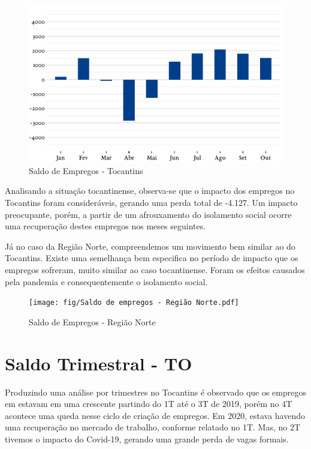 \begin{figure}[h]
	\caption{Saldo de Empregos - Tocantins}
	\includegraphics{fig/Saldo de empregos - Tocantins.pdf}
\end{figure}

\par Analisando a situação tocantinense, observa-se que o impacto dos
empregos no Tocantins foram consideráveis, gerando uma perda total de -4.127. Um impacto preocupante, porém, a partir de um afrouxamento do isolamento social ocorre uma recuperação destes empregos nos meses seguintes.

\par Já no caso da Região Norte, compreendemos um movimento bem similar ao do Tocantins. Existe uma semelhança bem especifica no período de impacto que os empregos sofreram, muito similar ao caso tocantinense. Foram os efeitos causados pela pandemia e consequentemente o isolamento social.

\begin{figure}[h]
	\caption{Saldo de Empregos - Região Norte}
	\texttt{[image: fig/Saldo de empregos - Região Norte.pdf]}
\end{figure}
\newpage
\section{Saldo Trimestral - TO}
\par Produzindo uma análise por trimestres no Tocantins é observado que os empregos em estavam em uma crescente partindo do 1T até o 3T de 2019, porém no 4T acontece uma queda nesse ciclo de criação de empregos. Em 2020, estava havendo uma recuperação no mercado de trabalho, conforme relatado no 1T. Mas, no 2T tivemos o impacto do Covid-19, gerando uma grande perda de vagas formais.

